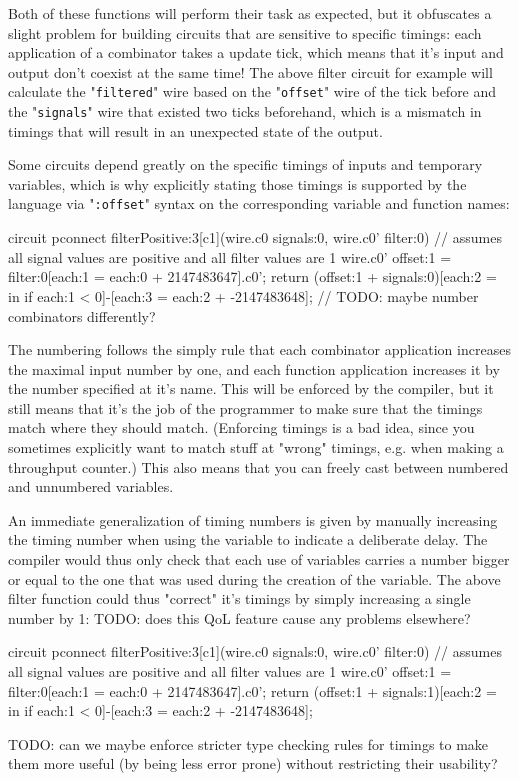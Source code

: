 \documentclass[landscape]{article}
\theoremstyle{plain}
\theoremstyle{definition}
\begin{document}
Both of these functions will perform their task as expected, but it obfuscates a slight problem for building circuits that are sensitive to specific timings: each application of a combinator takes a update tick, which means that it's input and output don't coexist at the same time! The above filter circuit for example will calculate the "\texttt{filtered}" wire based on the "\texttt{offset}" wire of the tick before and the "\texttt{signals}" wire that existed two ticks beforehand, which is a mismatch in timings that will result in an unexpected state of the output.

Some circuits depend greatly on the specific timings of inputs and temporary variables, which is why explicitly stating those timings is supported by the language via "\texttt{:offset}" syntax on the corresponding variable and function names:
\begin{langname}
circuit pconnect filterPositive:3[c1](wire.c0 signals:0, wire.c0' filter:0)
{  // assumes all signal values are positive and all filter values are 1
  wire.c0' offset:1 = filter:0[each:1 = each:0 + 2147483647].c0';
  return (offset:1 + signals:0)[each:2 = in if each:1 < 0]-[each:3 = each:2 + -2147483648];
} // TODO: maybe number combinators differently?
\end{langname}
The numbering follows the simply rule that each combinator application increases the maximal input number by one, and each function application increases it by the number specified at it's name. This will be enforced by the compiler, but it still means that it's the job of the programmer to make sure that the timings match where they should match. (Enforcing timings is a bad idea, since you sometimes explicitly want to match stuff at "wrong" timings, e.g. when making a throughput counter.) This also means that you can freely cast between numbered and unnumbered variables.

An immediate generalization of timing numbers is given by manually increasing the timing number when using the variable to indicate a deliberate delay. The compiler would thus only check that each use of variables carries a number bigger or equal to the one that was used during the creation of the variable. The above filter function could thus "correct" it's timings by simply increasing a single number by 1: TODO: does this QoL feature cause any problems elsewhere?
\begin{langname}
circuit pconnect filterPositive:3[c1](wire.c0 signals:0, wire.c0' filter:0)
{  // assumes all signal values are positive and all filter values are 1
  wire.c0' offset:1 = filter:0[each:1 = each:0 + 2147483647].c0';
  return (offset:1 + signals:1)[each:2 = in if each:1 < 0]-[each:3 = each:2 + -2147483648];
}
\end{langname}
TODO: can we maybe enforce stricter type checking rules for timings to make them more useful (by being less error prone) without restricting their usability?
\end{document}
